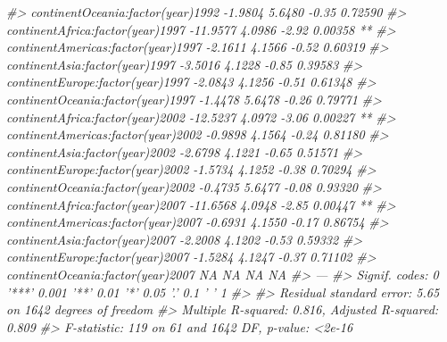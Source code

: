 \documentclass[
]{book}
\newenvironment{Shaded}{\begin{snugshade}}{\end{snugshade}}
\newcommand{\CommentTok}[1]{\textcolor[rgb]{0.56,0.35,0.01}{\textit{#1}}}
\begin{document}
\begin{Shaded}
\begin{Highlighting}[]
\CommentTok{#> continentOceania:factor(year)1992   -1.9804     5.6480   -0.35  0.72590    }
\CommentTok{#> continentAfrica:factor(year)1997   -11.9577     4.0986   -2.92  0.00358 ** }
\CommentTok{#> continentAmericas:factor(year)1997  -2.1611     4.1566   -0.52  0.60319    }
\CommentTok{#> continentAsia:factor(year)1997      -3.5016     4.1228   -0.85  0.39583    }
\CommentTok{#> continentEurope:factor(year)1997    -2.0843     4.1256   -0.51  0.61348    }
\CommentTok{#> continentOceania:factor(year)1997   -1.4478     5.6478   -0.26  0.79771    }
\CommentTok{#> continentAfrica:factor(year)2002   -12.5237     4.0972   -3.06  0.00227 ** }
\CommentTok{#> continentAmericas:factor(year)2002  -0.9898     4.1564   -0.24  0.81180    }
\CommentTok{#> continentAsia:factor(year)2002      -2.6798     4.1221   -0.65  0.51571    }
\CommentTok{#> continentEurope:factor(year)2002    -1.5734     4.1252   -0.38  0.70294    }
\CommentTok{#> continentOceania:factor(year)2002   -0.4735     5.6477   -0.08  0.93320    }
\CommentTok{#> continentAfrica:factor(year)2007   -11.6568     4.0948   -2.85  0.00447 ** }
\CommentTok{#> continentAmericas:factor(year)2007  -0.6931     4.1550   -0.17  0.86754    }
\CommentTok{#> continentAsia:factor(year)2007      -2.2008     4.1202   -0.53  0.59332    }
\CommentTok{#> continentEurope:factor(year)2007    -1.5284     4.1247   -0.37  0.71102    }
\CommentTok{#> continentOceania:factor(year)2007        NA         NA      NA       NA    }
\CommentTok{#> ---}
\CommentTok{#> Signif. codes:  0 '***' 0.001 '**' 0.01 '*' 0.05 '.' 0.1 ' ' 1}
\CommentTok{#> }
\CommentTok{#> Residual standard error: 5.65 on 1642 degrees of freedom}
\CommentTok{#> Multiple R-squared:  0.816,  Adjusted R-squared:  0.809 }
\CommentTok{#> F-statistic:  119 on 61 and 1642 DF,  p-value: <2e-16}


\end{Highlighting}
\end{Shaded}
\end{document}
